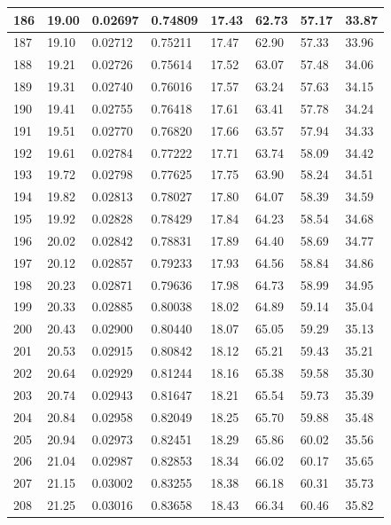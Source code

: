 \documentclass[12pt,a4paper,twoside]{article}
\begin{document}
\begin{center}
\begin{longtable}{l l l l | l l l l}
186 & 19.00 & 0.02697 & 0.74809 & 17.43 & 62.73 & 57.17 & 33.87 \\ \hline
187 & 19.10 & 0.02712 & 0.75211 & 17.47 & 62.90 & 57.33 & 33.96 \\ \hline
188 & 19.21 & 0.02726 & 0.75614 & 17.52 & 63.07 & 57.48 & 34.06 \\ \hline
189 & 19.31 & 0.02740 & 0.76016 & 17.57 & 63.24 & 57.63 & 34.15 \\ \hline
190 & 19.41 & 0.02755 & 0.76418 & 17.61 & 63.41 & 57.78 & 34.24 \\ \hline
191 & 19.51 & 0.02770 & 0.76820 & 17.66 & 63.57 & 57.94 & 34.33 \\ \hline
192 & 19.61 & 0.02784 & 0.77222 & 17.71 & 63.74 & 58.09 & 34.42 \\ \hline
193 & 19.72 & 0.02798 & 0.77625 & 17.75 & 63.90 & 58.24 & 34.51 \\ \hline
194 & 19.82 & 0.02813 & 0.78027 & 17.80 & 64.07 & 58.39 & 34.59 \\ \hline
195 & 19.92 & 0.02828 & 0.78429 & 17.84 & 64.23 & 58.54 & 34.68 \\ \hline
196 & 20.02 & 0.02842 & 0.78831 & 17.89 & 64.40 & 58.69 & 34.77 \\ \hline
197 & 20.12 & 0.02857 & 0.79233 & 17.93 & 64.56 & 58.84 & 34.86 \\ \hline
198 & 20.23 & 0.02871 & 0.79636 & 17.98 & 64.73 & 58.99 & 34.95 \\ \hline
199 & 20.33 & 0.02885 & 0.80038 & 18.02 & 64.89 & 59.14 & 35.04 \\ \hline
200 & 20.43 & 0.02900 & 0.80440 & 18.07 & 65.05 & 59.29 & 35.13 \\ \hline
201 & 20.53 & 0.02915 & 0.80842 & 18.12 & 65.21 & 59.43 & 35.21 \\ \hline
202 & 20.64 & 0.02929 & 0.81244 & 18.16 & 65.38 & 59.58 & 35.30 \\ \hline
203 & 20.74 & 0.02943 & 0.81647 & 18.21 & 65.54 & 59.73 & 35.39 \\ \hline
204 & 20.84 & 0.02958 & 0.82049 & 18.25 & 65.70 & 59.88 & 35.48 \\ \hline
205 & 20.94 & 0.02973 & 0.82451 & 18.29 & 65.86 & 60.02 & 35.56 \\ \hline
206 & 21.04 & 0.02987 & 0.82853 & 18.34 & 66.02 & 60.17 & 35.65 \\ \hline
207 & 21.15 & 0.03002 & 0.83255 & 18.38 & 66.18 & 60.31 & 35.73 \\ \hline
208 & 21.25 & 0.03016 & 0.83658 & 18.43 & 66.34 & 60.46 & 35.82 \\ \hline

\end{longtable}
\end{center}
\end{document}
